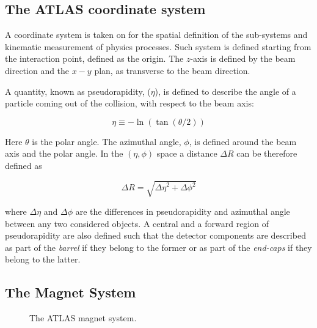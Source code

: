 		\subsection*{The ATLAS coordinate system}
		\label{par:coord}
			
			A coordinate system is taken on for the spatial definition of the sub-systems %
			and kinematic measurement of physics processes. Such system is defined starting from the interaction point, defined as the origin. The $z$-axis is defined by the beam direction and the $x-y$ plan, as transverse to the beam direction.

			A quantity, known as pseudorapidity, ($\eta$), is defined to describe the angle of a particle coming out of the collision, with respect to the beam axis: 

			\begin{equation*}
				\eta \equiv -\ln (\tan(\theta/2))
			\end{equation*}

			\noindent Here $\theta$ is the polar angle. The azimuthal angle, $\phi$, is defined around the beam axis and the polar angle. In the $(\eta,\phi)$ space a distance $\Delta R$ can be therefore defined as  
			
			\begin{equation*}
				\Delta R = \sqrt{{\Delta \eta}^2 + {\Delta \phi}^2}
			\end{equation*}

			\noindent where $\Delta \eta$ and $\Delta \phi$ are the differences in pseudorapidity and azimuthal angle between any two considered objects. A central and a forward region of pseudorapidity are also defined such that the detector components are described as part of the \emph{barrel} if they belong to the former or as part of the \emph{end-caps} if they belong to the latter. 



		\subsection{The Magnet System}
		\label{sec:magnet-system}
			
			\begin{figure}[!htb]
				\hfill
				\caption{The ATLAS magnet system.}
			\end{figure}

